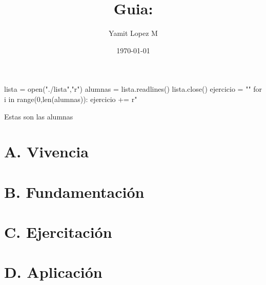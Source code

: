 \documentclass{scrartcl}
\title{Guia: }
\author{Yamit Lopez M}
\date{\today}
\begin{document}
\begin{sagesilent}
lista = open("./lista","r")
alumnas = lista.readlines()
lista.close()
ejercicio = ""
for i in range(0,len(alumnas)):
    ejercicio += r"%

\end{sagesilent}


Estas son las alumnas


\section{A. Vivencia}
\section{B. Fundamentaci\'on}
\section{C. Ejercitaci\'on}
\section{D. Aplicaci\'on}
\end{document}
